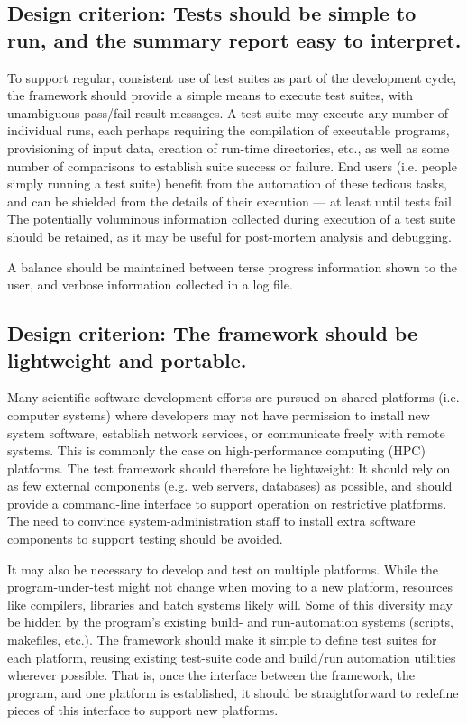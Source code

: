 \documentclass[conference]{IEEEtran}
\begin{document}
\subsection{Design criterion: Tests should be simple to run, and the summary report easy to interpret.}

To support regular, consistent use of test suites as part of the development cycle, the framework should provide a simple means to execute test suites, with unambiguous pass/fail result messages. A test suite may execute any number of individual runs, each perhaps requiring the compilation of executable programs, provisioning of input data, creation of run-time directories, etc., as well as some number of comparisons to establish suite success or failure. End users (i.e. people simply running a test suite) benefit from the automation of these tedious tasks, and can be shielded from the details of their execution --- at least until tests fail. The potentially voluminous information collected during execution of a test suite should be retained, as it may be useful for post-mortem analysis and debugging.

A balance should be maintained between terse progress information shown to the user, and verbose information collected in a log file.

\subsection{Design criterion: The framework should be lightweight and portable.}

Many scientific-software development efforts are pursued on shared platforms (i.e. computer systems) where developers may not have permission to install new system software, establish network services, or communicate freely with remote systems. This is commonly the case on high-performance computing (HPC) platforms. The test framework should therefore be lightweight: It should rely on as few external components (e.g. web servers, databases) as possible, and should provide a command-line interface to support operation on restrictive platforms. The need to convince system-administration staff to install extra software components to support testing should be avoided.

It may also be necessary to develop and test on multiple platforms. While the program-under-test might not change when moving to a new platform, resources like compilers, libraries and batch systems likely will. Some of this diversity may be hidden by the program's existing build- and run-automation systems (scripts, makefiles, etc.). The framework should make it simple to define test suites for each platform, reusing existing test-suite code and build/run automation utilities wherever possible. That is, once the interface between the framework, the program, and one platform is established, it should be straightforward to redefine pieces of this interface to support new platforms.
\end{document}

